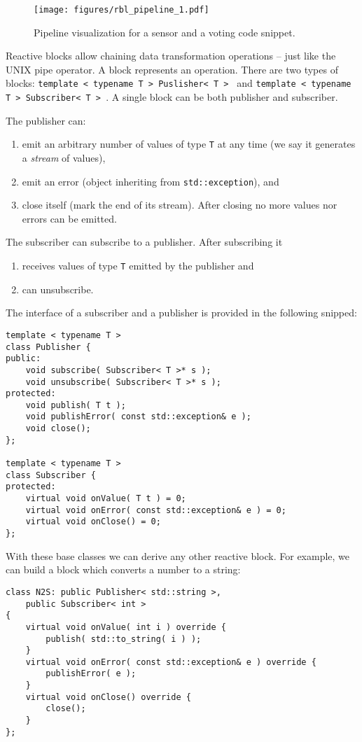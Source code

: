 \begin{figure}[!t]
    \centering
    \texttt{[image: figures/rbl\_pipeline\_1.pdf]}
    \caption{Pipeline visualization for a sensor and a voting code snippet.}
    \label{fig:rbl_example_1}
\end{figure}

Reactive blocks allow chaining data transformation operations -- just like the
UNIX pipe operator. A block represents an operation. There are two types of
blocks: \texttt{template < typename T > Puslisher< T > }
and \texttt{template < typename T > Subscriber< T > }.
A single block can be both publisher and subscriber.

\noindent The publisher can:
\begin{enumerate}
    \item emit an arbitrary number of values of type \texttt{T} at any time (we
    say it generates a \emph{stream} of values),
    \item emit an error (object inheriting from
    \texttt{std::exception}), and
    \item close itself (mark the end of its stream). After closing no more
    values nor errors can be emitted.
\end{enumerate}

\noindent The subscriber can subscribe to a publisher. After subscribing it
\begin{enumerate}
    \item receives values of type \texttt{T} emitted by the publisher and
    \item can unsubscribe.
\end{enumerate}

The interface of a subscriber and a publisher is provided in the
following snipped:
\begin{verbatim}
template < typename T >
class Publisher {
public:
    void subscribe( Subscriber< T >* s );
    void unsubscribe( Subscriber< T >* s );
protected:
    void publish( T t );
    void publishError( const std::exception& e );
    void close();
};

template < typename T >
class Subscriber {
protected:
    virtual void onValue( T t ) = 0;
    virtual void onError( const std::exception& e ) = 0;
    virtual void onClose() = 0;
};
\end{verbatim}

With these base classes we can derive any other reactive block. For example, we
can build a block which converts a number to a string:
\begin{verbatim}
class N2S: public Publisher< std::string >,
    public Subscriber< int >
{
    virtual void onValue( int i ) override {
        publish( std::to_string( i ) );
    }
    virtual void onError( const std::exception& e ) override {
        publishError( e );
    }
    virtual void onClose() override {
        close();
    }
};
\end{verbatim}

